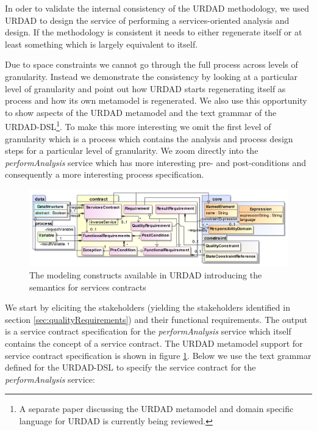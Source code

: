 In oder to validate the internal consistency of the URDAD methodology, we used URDAD to design the service of performing a services-oriented analysis and design. If the methodology is consistent it needs to either regenerate itself or at least something which is largely equivalent to itself. 

Due to space constraints we cannot go through the full process across levels of granularity. Instead we demonstrate the consistency by looking at a particular level of granularity and point out how URDAD starts regenerating itself as process and how its own metamodel is regenerated. We also use this opportunity to show aspects of the URDAD metamodel and the text grammar of the URDAD-DSL\footnote{A separate paper discussing the URDAD metamodel and domain specific language for URDAD is currently being reviewed.}. To make this more interesting we omit the first level of granularity which is a process which contains the analysis and process design steps for a particular level of granularity. We zoom directly into the \emph{performAnalysis} service which has more interesting pre- and post-conditions and consequently a more interesting process specification.

\begin{figure}[Htbp]
  \centering
  \includegraphics{contract}
  \caption{The modeling constructs available in URDAD introducing the semantics for services contracts}
  \label{fig:contractModule}
\end{figure}

We start by eliciting the stakeholders (yielding the stakeholders identified in section \ref{sec:qualityRequirements}) and their functional requirements. The output is a service contract specification for the \emph{performAnalysis} service which itself contains the concept of a service contract. The URDAD metamodel support for service contract specification is shown in figure \ref{fig:contractModule}. Below we use the text grammar defined for the URDAD-DSL to specify the service contract for the \emph{performAnalysis} service:


